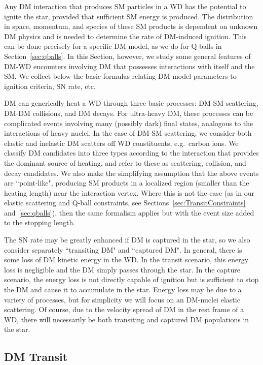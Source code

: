 Any DM interaction that produces SM particles in a WD has the potential to ignite the star, provided that sufficient SM energy is produced.
The distribution in space, momentum, and species of these SM products is dependent on unknown DM physics and is needed to determine the rate of DM-induced ignition.
This can be done precisely for a specific DM model, as we do for Q-balls in Section~\ref{sec:qballs}.
In this Section, however, we study some general features of DM-WD encounters involving DM that possesses interactions with itself and the SM.
We collect below the basic formulas relating DM model parameters to ignition criteria, SN rate, etc.

DM can generically heat a WD through three basic processes: DM-SM scattering, DM-DM collisions, and DM decays.
For ultra-heavy DM, these processes can be complicated events involving many (possibly dark) final states, analogous to the interactions of heavy nuclei.
In the case of DM-SM scattering, we consider both elastic and inelastic DM scatters off WD constituents, e.g.~carbon ions.
We classify DM candidates into three types according to the interaction that provides the dominant source of heating, and refer to these as scattering, collision, and decay candidates.
We also make the simplifying assumption that the above events are ``point-like", producing SM products in a localized region (smaller than the heating length) near the interaction vertex.
Where this is not the case (as in our elastic scattering and Q-ball constraints, see Sections~\ref{sec:TransitConstraints} and~\ref{sec:qballs}), then the same formalism applies but with the event size added to the stopping length.

The SN rate may be greatly enhanced if DM is captured in the star, so we also consider separately ``transiting DM" and ``captured DM".
In general, there is some loss of DM kinetic energy in the WD.
In the transit scenario, this energy loss is negligible and the DM simply passes through the star.
In the capture scenario, the energy loss is not directly capable of ignition but is sufficient to stop the DM and cause it to accumulate in the star.
Energy loss may be due to a variety of processes, but for simplicity we will focus on an DM-nuclei elastic scattering.
Of course, due to the velocity spread of DM in the rest frame of a WD, there will necessarily be both transiting and captured DM populations in the star.

\subsection{DM Transit}

